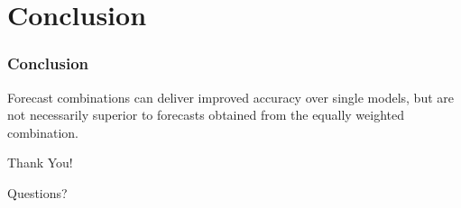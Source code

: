 
\section{Conclusion}

\begin{frame}
	\frametitle{Conclusion}
 
 Forecast combinations can deliver improved accuracy over single models, but are not necessarily superior to forecasts obtained from the equally weighted combination.

\end{frame}



\begin{frame}

     \begin{center}
        {\Huge\atchen Thank You!}
    \end{center}
    
    \bigskip
    
    \begin{center}
            {\LARGE Questions?}
    \end{center}
    
\end{frame}